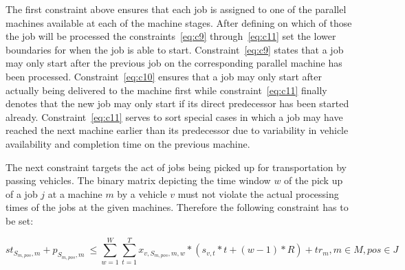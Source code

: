 The first constraint above ensures that each job is assigned to one of the parallel machines available at each of the machine stages. After defining
on which of those the job will be processed the constraints~\ref{eq:c9} through~\ref{eq:c11} set the lower boundaries for when the job is able to start. Constraint~\ref{eq:c9} states that a job may only start after the previous job on the corresponding parallel machine has been processed. Constraint~\ref{eq:c10} ensures
that a job may only start after actually being delivered to the machine first while constraint~\ref{eq:c11} finally denotes that the new job may only start
if its direct predecessor has been started already. Constraint~\ref{eq:c11} serves to sort special cases in which a job may have reached the next machine
earlier than its predecessor due to variability in vehicle availability and completion time on the previous machine.

The next constraint targets the act of jobs being picked up for transportation by passing vehicles. The binary matrix depicting the
time window \(w\) of the pick up of a job \(j\) at a machine \(m\) by a vehicle \(v\) must not violate the actual processing times of the jobs at
the given machines. Therefore the following constraint has to be set:

\begin{equation} \label{eq:c13}
  st_{S_{m,pos},m} + p_{S_{m,pos},m}\> \leq \sum_{w=1}^{W}\sum_{t=1}^{T} x_{v,S_{m,pos},m,w} * (s_{v,t} * t + (w-1) * R) + tr_{m}, m \in M, pos \in J
\end{equation}